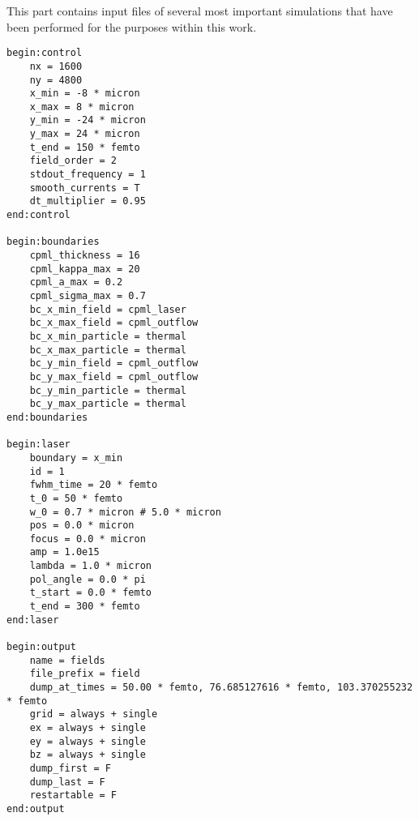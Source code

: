 This part contains input files of several most important simulations that have been performed for the purposes within this work.  

\begin{lstlisting}[style=CXX, caption=test lbcs]
begin:control
	nx = 1600
	ny = 4800
	x_min = -8 * micron
	x_max = 8 * micron
	y_min = -24 * micron
	y_max = 24 * micron
	t_end = 150 * femto
	field_order = 2
	stdout_frequency = 1
	smooth_currents = T
	dt_multiplier = 0.95
end:control

begin:boundaries
	cpml_thickness = 16
	cpml_kappa_max = 20
	cpml_a_max = 0.2
	cpml_sigma_max = 0.7
	bc_x_min_field = cpml_laser
	bc_x_max_field = cpml_outflow
	bc_x_min_particle = thermal
	bc_x_max_particle = thermal
	bc_y_min_field = cpml_outflow
	bc_y_max_field = cpml_outflow
	bc_y_min_particle = thermal
	bc_y_max_particle = thermal
end:boundaries

begin:laser
	boundary = x_min
	id = 1
	fwhm_time = 20 * femto
	t_0 = 50 * femto
	w_0 = 0.7 * micron # 5.0 * micron
	pos = 0.0 * micron
	focus = 0.0 * micron
	amp = 1.0e15
	lambda = 1.0 * micron
	pol_angle = 0.0 * pi
	t_start = 0.0 * femto
	t_end = 300 * femto
end:laser

begin:output
	name = fields
	file_prefix = field
	dump_at_times = 50.00 * femto, 76.685127616 * femto, 103.370255232 * femto
	grid = always + single
	ex = always + single
	ey = always + single
	bz = always + single
	dump_first = F
	dump_last = F
	restartable = F
end:output
\end{lstlisting}

